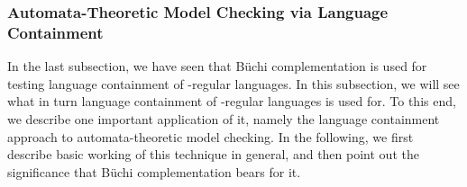 






\subsubsection{Automata-Theoretic Model Checking via Language Containment}
In the last subsection, we have seen that Büchi complementation is used for testing language containment of \om-regular languages. In this subsection, we will see what in turn language containment of \om-regular languages is used for. To this end, we describe one important application of it, namely the language containment approach to automata-theoretic model checking. In the following, we first describe basic working of this technique in general, and then point out the significance that Büchi complementation bears for it.

